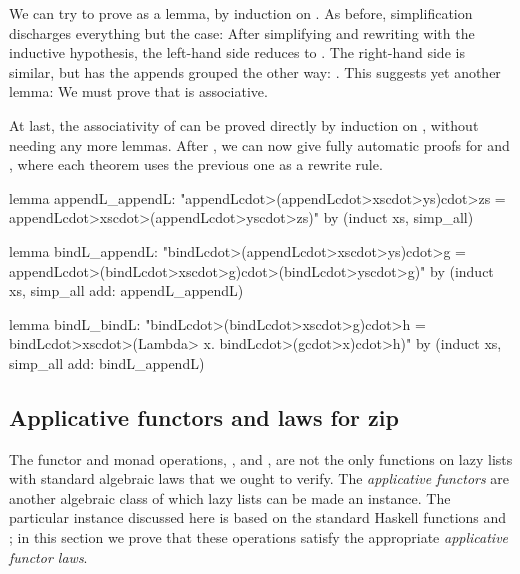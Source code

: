 We can try to prove  as a lemma, by induction on . As before, simplification discharges everything but the  case: After simplifying and rewriting with the inductive hypothesis, the left-hand side reduces to . The right-hand side is similar, but has the appends grouped the other way:  . This suggests yet another lemma: We must prove that  is associative.

At last, the associativity of  can be proved directly by induction on , without needing any more lemmas. After , we can now give fully automatic proofs for  and , where each theorem uses the previous one as a rewrite rule.
%
\begin{isacode}
lemma appendL_appendL:
    "appendL\<cdot>(appendL\<cdot>xs\<cdot>ys)\<cdot>zs = appendL\<cdot>xs\<cdot>(appendL\<cdot>ys\<cdot>zs)"
  by (induct xs, simp_all)
\end{isacode}
\unmedskip
{}
\begin{isacode}
lemma bindL_appendL:
    "bindL\<cdot>(appendL\<cdot>xs\<cdot>ys)\<cdot>g = appendL\<cdot>(bindL\<cdot>xs\<cdot>g)\<cdot>(bindL\<cdot>ys\<cdot>g)"
  by (induct xs, simp_all add: appendL_appendL)
\end{isacode}
\unmedskip
{}
\begin{isacode}
lemma bindL_bindL: "bindL\<cdot>(bindL\<cdot>xs\<cdot>g)\<cdot>h = bindL\<cdot>xs\<cdot>(\<Lambda> x. bindL\<cdot>(g\<cdot>x)\<cdot>h)"
  by (induct xs, simp_all add: bindL_appendL)
\end{isacode}

\subsection{Applicative functors and laws for zip}
\label{sec:case-applicative}

The functor and monad operations, ,  and \hs{(>{}>=)}, are not the only functions on lazy lists with standard algebraic laws that we ought to verify. The \emph{applicative functors} are another algebraic class of which lazy lists can be made an instance. The particular instance discussed here is based on the standard Haskell functions  and ; in this section we prove that these operations satisfy the appropriate \emph{applicative functor laws}.

